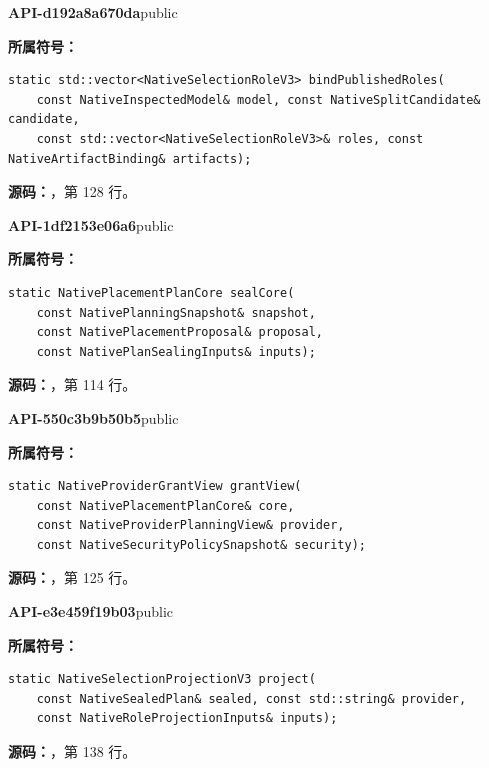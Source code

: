 \textbf{API-d192a8a670da}\quad public\par
\textbf{所属符号：}\par
\begin{Verbatim}[fontsize=\footnotesize,breaklines,breakanywhere]
static std::vector<NativeSelectionRoleV3> bindPublishedRoles(
    const NativeInspectedModel& model, const NativeSplitCandidate& candidate,
    const std::vector<NativeSelectionRoleV3>& roles, const NativeArtifactBinding& artifacts);
\end{Verbatim}
\textbf{源码：}，第 128 行。\par

\textbf{API-1df2153e06a6}\quad public\par
\textbf{所属符号：}\par
\begin{Verbatim}[fontsize=\footnotesize,breaklines,breakanywhere]
static NativePlacementPlanCore sealCore(
    const NativePlanningSnapshot& snapshot,
    const NativePlacementProposal& proposal,
    const NativePlanSealingInputs& inputs);
\end{Verbatim}
\textbf{源码：}，第 114 行。\par

\textbf{API-550c3b9b50b5}\quad public\par
\textbf{所属符号：}\par
\begin{Verbatim}[fontsize=\footnotesize,breaklines,breakanywhere]
static NativeProviderGrantView grantView(
    const NativePlacementPlanCore& core,
    const NativeProviderPlanningView& provider,
    const NativeSecurityPolicySnapshot& security);
\end{Verbatim}
\textbf{源码：}，第 125 行。\par

\textbf{API-e3e459f19b03}\quad public\par
\textbf{所属符号：}\par
\begin{Verbatim}[fontsize=\footnotesize,breaklines,breakanywhere]
static NativeSelectionProjectionV3 project(
    const NativeSealedPlan& sealed, const std::string& provider,
    const NativeRoleProjectionInputs& inputs);
\end{Verbatim}
\textbf{源码：}，第 138 行。\par

